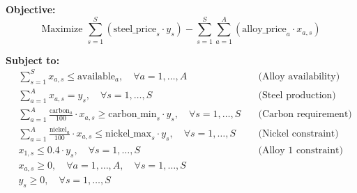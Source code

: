 \documentclass{article}
\begin{document}
\textbf{Objective:}
\[
\text{Maximize } \sum_{s=1}^{S} \left( \text{steel\_price}_s \cdot y_s \right) - \sum_{s=1}^{S} \sum_{a=1}^{A} \left( \text{alloy\_price}_a \cdot x_{a,s} \right)
\]

\textbf{Subject to:}
\begin{align*}
& \sum_{s=1}^{S} x_{a,s} \leq \text{available}_a, \quad \forall a = 1, \ldots, A \quad & \text{(Alloy availability)}\\
& \sum_{a=1}^{A} x_{a,s} = y_s, \quad \forall s = 1, \ldots, S \quad & \text{(Steel production)}\\
& \sum_{a=1}^{A} \frac{\text{carbon}_a}{100} \cdot x_{a,s} \geq \text{carbon\_min}_s \cdot y_s, \quad \forall s = 1, \ldots, S \quad & \text{(Carbon requirement)}\\
& \sum_{a=1}^{A} \frac{\text{nickel}_a}{100} \cdot x_{a,s} \leq \text{nickel\_max}_s \cdot y_s, \quad \forall s = 1, \ldots, S \quad & \text{(Nickel constraint)}\\
& x_{1,s} \leq 0.4 \cdot y_s, \quad \forall s = 1, \ldots, S \quad & \text{(Alloy 1 constraint)}\\
& x_{a,s} \geq 0, \quad \forall a = 1, \ldots, A, \quad \forall s = 1, \ldots, S\\
& y_s \geq 0, \quad \forall s = 1, \ldots, S
\end{align*}
\end{document}
